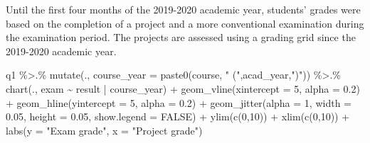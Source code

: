 \documentclass[
]{article}
\newenvironment{Shaded}{\begin{snugshade}}{\end{snugshade}}
\newcommand{\AttributeTok}[1]{\textcolor[rgb]{0.77,0.63,0.00}{#1}}
\newcommand{\CommentTok}[1]{\textcolor[rgb]{0.56,0.35,0.01}{\textit{#1}}}
\newcommand{\ConstantTok}[1]{\textcolor[rgb]{0.00,0.00,0.00}{#1}}
\newcommand{\DecValTok}[1]{\textcolor[rgb]{0.00,0.00,0.81}{#1}}
\newcommand{\FloatTok}[1]{\textcolor[rgb]{0.00,0.00,0.81}{#1}}
\newcommand{\FunctionTok}[1]{\textcolor[rgb]{0.00,0.00,0.00}{#1}}
\newcommand{\NormalTok}[1]{#1}
\newcommand{\OtherTok}[1]{\textcolor[rgb]{0.56,0.35,0.01}{#1}}
\newcommand{\SpecialCharTok}[1]{\textcolor[rgb]{0.00,0.00,0.00}{#1}}
\newcommand{\StringTok}[1]{\textcolor[rgb]{0.31,0.60,0.02}{#1}}
\begin{document}
\begin{Shaded}
\end{Shaded}

Until the first four months of the 2019-2020 academic year, students'
grades were based on the completion of a project and a more conventional
examination during the examination period. The projects are assessed
using a grading grid since the 2019-2020 academic year.

\begin{Shaded}
\begin{Highlighting}[]
\NormalTok{q1 }\SpecialCharTok{\%\textgreater{}.\%}
  \FunctionTok{mutate}\NormalTok{(., }\AttributeTok{course\_year =} \FunctionTok{paste0}\NormalTok{(course, }\StringTok{" ("}\NormalTok{,acad\_year,}\StringTok{")"}\NormalTok{)) }\SpecialCharTok{\%\textgreater{}.\%}
  \FunctionTok{chart}\NormalTok{(., exam }\SpecialCharTok{\textasciitilde{}}\NormalTok{ result }\SpecialCharTok{|}\NormalTok{ course\_year) }\SpecialCharTok{+}
  \FunctionTok{geom\_vline}\NormalTok{(}\AttributeTok{xintercept =} \DecValTok{5}\NormalTok{, }\AttributeTok{alpha =} \FloatTok{0.2}\NormalTok{) }\SpecialCharTok{+}
  \FunctionTok{geom\_hline}\NormalTok{(}\AttributeTok{yintercept =} \DecValTok{5}\NormalTok{, }\AttributeTok{alpha =} \FloatTok{0.2}\NormalTok{) }\SpecialCharTok{+}
  \FunctionTok{geom\_jitter}\NormalTok{(}\AttributeTok{alpha =} \DecValTok{1}\NormalTok{, }\AttributeTok{width =} \FloatTok{0.05}\NormalTok{, }\AttributeTok{height =} \FloatTok{0.05}\NormalTok{, }\AttributeTok{show.legend =} \ConstantTok{FALSE}\NormalTok{) }\SpecialCharTok{+}
  \FunctionTok{ylim}\NormalTok{(}\FunctionTok{c}\NormalTok{(}\DecValTok{0}\NormalTok{,}\DecValTok{10}\NormalTok{)) }\SpecialCharTok{+}
  \FunctionTok{xlim}\NormalTok{(}\FunctionTok{c}\NormalTok{(}\DecValTok{0}\NormalTok{,}\DecValTok{10}\NormalTok{)) }\SpecialCharTok{+}
  \FunctionTok{labs}\NormalTok{(}\AttributeTok{y =} \StringTok{"Exam grade"}\NormalTok{, }\AttributeTok{x =} \StringTok{"Project grade"}\NormalTok{)}
\end{Highlighting}
\end{Shaded}
\end{document}
